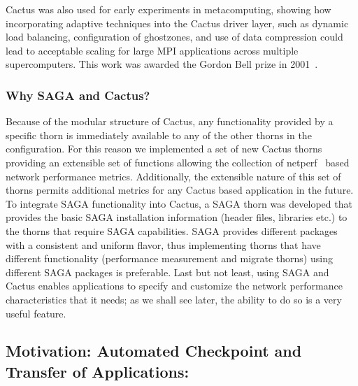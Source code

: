 \documentclass[conference,final]{IEEEtran}
\begin{document}

Cactus was also used for early experiments in metacomputing, showing
how incorporating adaptive techniques into the Cactus driver layer,
such as dynamic load balancing, configuration of ghostzones, and use
of data compression could lead to acceptable scaling for large MPI
applications across multiple supercomputers. This work was awarded the
Gordon Bell prize in 2001~\cite{Cactus_GordonBell}.

\subsubsection{Why SAGA and Cactus?} 

Because of the modular structure of Cactus, any functionality provided
by a specific thorn is immediately available to any of the other
thorns in the configuration. For this reason we implemented a set of
new Cactus thorns providing an extensible set of functions allowing
the collection of netperf~\cite{netperf_web} based network performance
metrics. Additionally, the extensible nature of this set of thorns
permits additional metrics for any Cactus based application in the
future.  To integrate SAGA functionality into Cactus, a SAGA thorn was
developed that provides the basic SAGA installation information
(header files, libraries etc.)  to the thorns that require SAGA
capabilities.  SAGA provides different packages with a consistent and
uniform flavor, thus implementing thorns that have different
functionality (performance measurement and migrate thorns) using
different SAGA packages is preferable. Last but not least, using SAGA
and Cactus enables applications to specify and customize the network
performance characteristics that it needs; as we shall see later, the
ability to do so is a very useful feature.

\subsection{Motivation: Automated Checkpoint and Transfer of
  Applications:}
\end{document}
